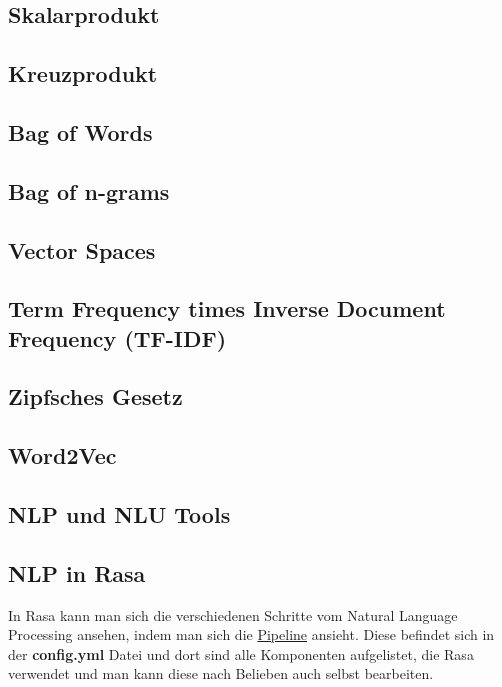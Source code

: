 \subsection{Skalarprodukt}

\subsection{Kreuzprodukt}


\subsection{Bag of Words}


\subsection{Bag of n-grams}


\subsection{Vector Spaces}


\subsection{Term Frequency times Inverse Document Frequency (TF-IDF)}


\subsection{Zipfsches Gesetz}


\subsection{Word2Vec}


\subsection{NLP und NLU Tools}


\subsection{NLP in Rasa}

In Rasa kann man sich die verschiedenen Schritte vom Natural Language Processing ansehen, indem man sich die \hyperref[sec:pipeline]{Pipeline} ansieht.
Diese befindet sich in der \textbf{config.yml} Datei und dort sind alle Komponenten aufgelistet, die Rasa verwendet und man kann diese nach Belieben auch selbst bearbeiten.